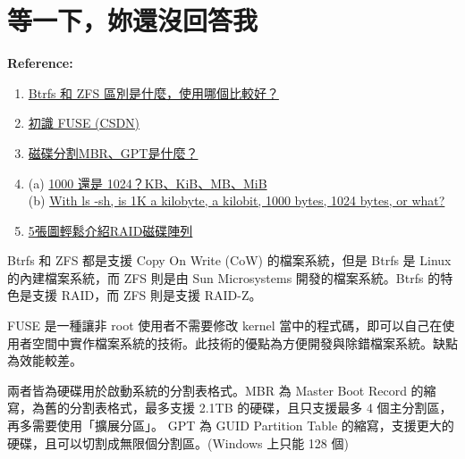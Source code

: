 \documentclass[12pt]{article}
\newenvironment{problem}[2][Problem]{\begin{trivlist}
\item[\hskip \labelsep {\bfseries #1}\hskip \labelsep {\bfseries #2}]}{\end{trivlist}}
\newenvironment{mycolorbox}[1][gray]{
  \renewmdenv[
    linewidth=2pt, linecolor=#1, backgroundcolor=#1!10,
    topline=false, bottomline=false, rightline=false,
    skipabove=10pt, skipbelow=10pt, innerleftmargin=10pt,
    innerrightmargin=0pt, innertopmargin=5pt, innerbottommargin=5pt
  ]{myquote}
  \begin{myquote}
}{\end{myquote}}
\begin{document}
\section{等一下，妳還沒回答我}
\begin{mycolorbox}[teal]
  \textbf{Reference:}
  \footnotesize
  \begin{enumerate}
    \item \href{https://www.ecscoupon.com/4536.html}{Btrfs 和 ZFS 區別是什麼，使用哪個比較好？}
    \item \href{https://blog.csdn.net/weixin_42792088/article/details/132862333}{初識 FUSE (CSDN)}
    \item \href{https://www.linwei.com.tw/forum-detail/76/}{磁碟分割MBR、GPT是什麼？}
    \item (a) \href{https://blog.darkthread.net/blog/1000-vs-1024-kb-kib/}{1000 還是 1024？KB、KiB、MB、MiB} \\
      (b) \href{https://superuser.com/questions/1741437/with-ls-sh-is-1k-a-kilobyte-a-kilobit-1000-bytes-1024-bytes-or-what}{With ls -sh, is 1K a kilobyte, a kilobit, 1000 bytes, 1024 bytes, or what?}
    \item \href{https://raidnas.tw/hsinchu-nas-raid-explain-rescue/}{5張圖輕鬆介紹RAID磁碟陣列}
  \end{enumerate}
\end{mycolorbox}

\begin{problem}{8.1}
  Btrfs 和 ZFS 都是支援 Copy On Write (CoW) 的檔案系統，但是 Btrfs 是 Linux 的內建檔案系統，而 ZFS 則是由 Sun Microsystems 開發的檔案系統。Btrfs 的特色是支援 RAID，而 ZFS 則是支援 RAID-Z。
\end{problem}

\begin{problem}{8.2}
  FUSE 是一種讓非 root 使用者不需要修改 kernel 當中的程式碼，即可以自己在使用者空間中實作檔案系統的技術。此技術的優點為方便開發與除錯檔案系統。缺點為效能較差。
\end{problem}

\begin{problem}{8.3}
  兩者皆為硬碟用於啟動系統的分割表格式。MBR 為 Master Boot Record 的縮寫，為舊的分割表格式，最多支援 2.1TB 的硬碟，且只支援最多 4 個主分割區，再多需要使用「擴展分區」。 GPT 為 GUID Partition Table 的縮寫，支援更大的硬碟，且可以切割成無限個分割區。(Windows 上只能 128 個)
\end{problem}
\end{document}
